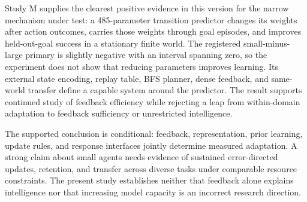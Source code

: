 \documentclass[11pt]{article}
\begin{document}
Study M supplies the clearest positive evidence in this version for the
narrow mechanism under test: a 485-parameter transition predictor changes its
weights after action outcomes, carries those weights through goal episodes, and
improves held-out-goal success in a stationary finite world. The registered
small-minus-large primary is slightly negative with an interval spanning zero,
so the experiment does not show that reducing parameters improves learning.
Its external state encoding, replay table, BFS planner, dense feedback, and
same-world transfer define a capable system around the predictor. The result
supports continued study of feedback efficiency while rejecting a leap from
within-domain adaptation to feedback sufficiency or unrestricted intelligence.

The supported conclusion is conditional: feedback, representation, prior
learning, update rules, and response interfaces jointly determine measured
adaptation. A strong claim about small agents needs evidence of sustained
error-directed updates, retention, and transfer across diverse tasks under
comparable resource constraints. The present study establishes neither that
feedback alone explains intelligence nor that increasing model capacity is an
incorrect research direction.
\end{document}
